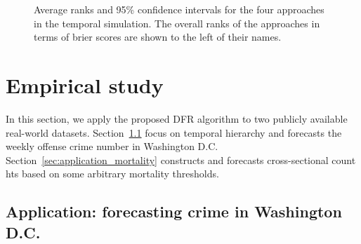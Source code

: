 \documentclass[a4paper,review,12pt,authoryear]{elsarticle}
\begin{document}
\begin{figure}
  \caption{\label{fig:sim_temporal_mcb_prob}Average ranks and 95\% confidence intervals for the four approaches in the temporal simulation. The overall ranks of the approaches in terms of brier scores are shown to the left of their names.}
   \qquad
   \qquad
\end{figure}

\section{Empirical study}
\label{sec:application}
In this section, we apply the proposed DFR algorithm to two publicly available real-world datasets.
Section~\ref{sec:application_crime} focus on temporal hierarchy and forecasts the weekly offense crime number in Washington D.C.
Section~\ref{sec:application_mortality} constructs and forecasts cross-sectional count hts based on some arbitrary mortality thresholds. 

\subsection{Application: forecasting crime in Washington D.C.}
\label{sec:application_crime}
\end{document}
